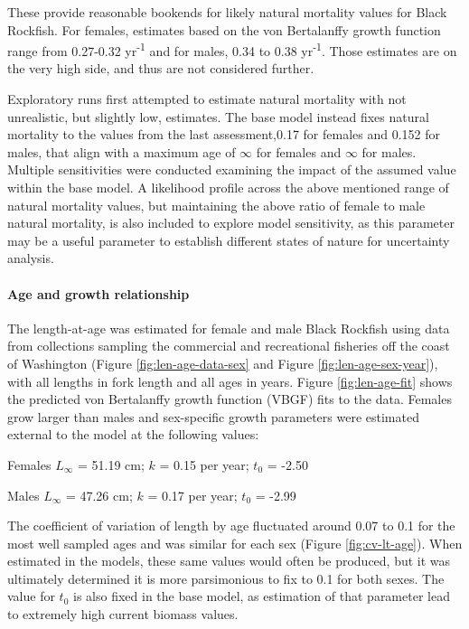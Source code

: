 \documentclass[11pt,
  english,
  letterpaper,
]{article}
\begin{document}
These provide reasonable bookends for likely natural mortality values for Black Rockfish. For females, estimates based on the von Bertalanffy growth function range from 0.27-0.32 yr\textsuperscript{-1} and for males, 0.34 to 0.38 yr\textsuperscript{-1}. Those estimates are on the very high side, and thus are not considered further.

Exploratory runs first attempted to estimate natural mortality with not unrealistic, but slightly low, estimates. The base model instead fixes natural mortality to the values from the last assessment,0.17 for females and 0.152 for males, that align with a maximum age of \ensuremath{\infty{}} for females and \ensuremath{\infty{}} for males. Multiple sensitivities were conducted examining the impact of the assumed value within the base model. A likelihood profile across the above mentioned range of natural mortality values, but maintaining the above ratio of female to male natural mortality, is also included to explore model sensitivity, as this parameter may be a useful parameter to establish different states of nature for uncertainty analysis.

\hypertarget{age-and-growth-relationship}{%
\paragraph{Age and growth relationship}\label{age-and-growth-relationship}}

The length-at-age was estimated for female and male Black Rockfish using data from collections sampling the commercial and recreational fisheries off the coast of Washington (Figure \ref{fig:len-age-data-sex} and Figure \ref{fig:len-age-sex-year}), with all lengths in fork length and all ages in years. Figure \ref{fig:len-age-fit} shows the predicted von Bertalanffy growth function (VBGF) fits to the data. Females grow larger than males and sex-specific growth parameters were estimated external to the model at the following values:

\begin{centering}

Females $L_{\infty}$ = 51.19 cm; $k$ = 0.15 per year; $t_0$ = -2.50

Males $L_{\infty}$ = 47.26 cm; $k$ = 0.17 per year; $t_0$ = -2.99

\end{centering}

\vspace{0.5cm}

The coefficient of variation of length by age fluctuated around 0.07 to 0.1 for the most well sampled ages and was similar for each sex (Figure \ref{fig:cv-lt-age}). When estimated in the models, these same values would often be produced, but it was ultimately determined it is more parsimonious to fix to 0.1 for both sexes. The value for \(t_0\) is also fixed in the base model, as estimation of that parameter lead to extremely high current biomass values.
\end{document}
